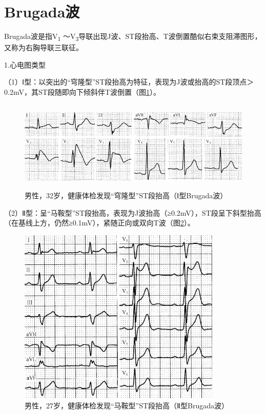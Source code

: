 \protect\hypertarget{text00010.htmlux5cux23subid71}{}{}

\section{Brugada波}

Brugada波是指V\textsubscript{1} ～V\textsubscript{3}导联出现J波、ST段抬高、T波倒置酷似右束支阻滞图形，又称为右胸导联三联征。

1.心电图类型

（1）Ⅰ型：以突出的“穹隆型”ST段抬高为特征，表现为J波或抬高的ST段顶点＞0.2mV，其ST段随即向下倾斜伴T波倒置（图\ref{fig4-4}）。

\begin{figure}[!htbp]
 \centering
 \includegraphics[width=5.48958in,height=1.70833in]{./images/Image00079.jpg}
 \captionsetup{justification=centering}
 \caption{男性，32岁，健康体检发现“穹隆型”ST段抬高（Ⅰ型Brugada波）}
 \label{fig4-4}
  \end{figure} 

（2）Ⅱ型：呈“马鞍型”ST段抬高，表现为J波抬高（≥0.2mV），ST段呈下斜型抬高（在基线上方，仍然≥0.1mV），紧随正向或双向T波（图\ref{fig4-5}）。

\begin{figure}[!htbp]
 \centering
 \includegraphics[width=3.8125in,height=3.3125in]{./images/Image00080.jpg}
 \captionsetup{justification=centering}
 \caption{男性，27岁，健康体检发现“马鞍型”ST段抬高（Ⅱ型Brugada波）}
 \label{fig4-5}
  \end{figure} 

